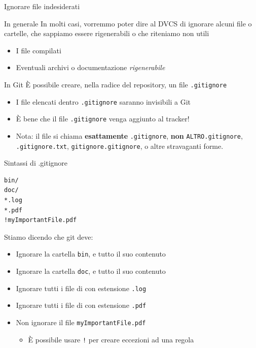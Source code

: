 \documentclass[xcolor=dvipsnames,presentation]{beamer}
\begin{document}
\begin{frame}{Ignorare file indesiderati}
    \begin{block}{In generale}
        In molti casi, vorremmo poter dire al DVCS di ignorare alcuni file o cartelle, che sappiamo
essere rigenerabili o che riteniamo non utili
        \begin{itemize}
            \item I file compilati
            \item Eventuali archivi o documentazione \textit{rigenerabile}
        \end{itemize}
    \end{block}
    \begin{block}{In Git}
        È possibile creare, nella radice del repository, un file \texttt{.gitignore}
        \begin{itemize}
            \item I file elencati dentro \texttt{.gitignore} saranno invisibili a Git
            \item È bene che il file \texttt{.gitignore} venga aggiunto al tracker!
            \item Nota: il file si chiama \textbf{esattamente} \texttt{.gitignore},
            \textbf{non} \texttt{ALTRO.gitignore}, \texttt{.gitignore.txt}, \texttt{gitignore.gitignore}, o altre stravaganti forme.
        \end{itemize}
    \end{block}
    \begin{block}{Sintassi di .gitignore}
        \begin{Verbatim}[fontsize=\scriptsize]
bin/
doc/
*.log
*.pdf
!myImportantFile.pdf
        \end{Verbatim}
        Stiamo dicendo che git deve:
        \begin{itemize}
            \item Ignorare la cartella \texttt{bin}, e tutto il suo contenuto
            \item Ignorare la cartella \texttt{doc}, e tutto il suo contenuto
            \item Ignorare tutti i file di con estensione \texttt{.log}
            \item Ignorare tutti i file di con estensione \texttt{.pdf}
            \item Non ignorare il file \texttt{myImportantFile.pdf}
            \begin{itemize}
                \item È possibile usare \texttt{!} per creare eccezioni ad una regola

\end{itemize}
\end{itemize}
\end{block}
\end{frame}
\end{document}
